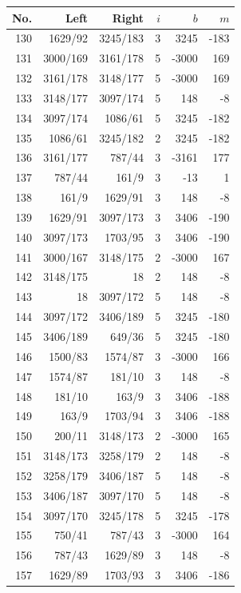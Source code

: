 \documentclass[11pt,a4paper]{article}
\begin{document}
\begin{minipage}[t]{.49\linewidth}\centering\footnotesize\setlength{\tabcolsep}{2pt}\renewcommand{\arraystretch}{1.09}
\begin{tabular*}{\linewidth}{@{}r@{\extracolsep{\fill}}rrrrr@{}}\toprule
No. & Left & Right & $i$ & $b$ & $m$\\\midrule
130 & 1629/92 & 3245/183 & 3 & 3245 & -183\\
131 & 3000/169 & 3161/178 & 5 & -3000 & 169\\
132 & 3161/178 & 3148/177 & 5 & -3000 & 169\\
133 & 3148/177 & 3097/174 & 5 & 148 & -8\\
134 & 3097/174 & 1086/61 & 5 & 3245 & -182\\
135 & 1086/61 & 3245/182 & 2 & 3245 & -182\\
136 & 3161/177 & 787/44 & 3 & -3161 & 177\\
137 & 787/44 & 161/9 & 3 & -13 & 1\\
138 & 161/9 & 1629/91 & 3 & 148 & -8\\
139 & 1629/91 & 3097/173 & 3 & 3406 & -190\\
140 & 3097/173 & 1703/95 & 3 & 3406 & -190\\
141 & 3000/167 & 3148/175 & 2 & -3000 & 167\\
142 & 3148/175 & 18 & 2 & 148 & -8\\
143 & 18 & 3097/172 & 5 & 148 & -8\\
144 & 3097/172 & 3406/189 & 5 & 3245 & -180\\
145 & 3406/189 & 649/36 & 5 & 3245 & -180\\
146 & 1500/83 & 1574/87 & 3 & -3000 & 166\\
147 & 1574/87 & 181/10 & 3 & 148 & -8\\
148 & 181/10 & 163/9 & 3 & 3406 & -188\\
149 & 163/9 & 1703/94 & 3 & 3406 & -188\\
150 & 200/11 & 3148/173 & 2 & -3000 & 165\\
151 & 3148/173 & 3258/179 & 2 & 148 & -8\\
152 & 3258/179 & 3406/187 & 5 & 148 & -8\\
153 & 3406/187 & 3097/170 & 5 & 148 & -8\\
154 & 3097/170 & 3245/178 & 5 & 3245 & -178\\
155 & 750/41 & 787/43 & 3 & -3000 & 164\\
156 & 787/43 & 1629/89 & 3 & 148 & -8\\
157 & 1629/89 & 1703/93 & 3 & 3406 & -186\\

\end{tabular*}
\end{minipage}
\end{document}

